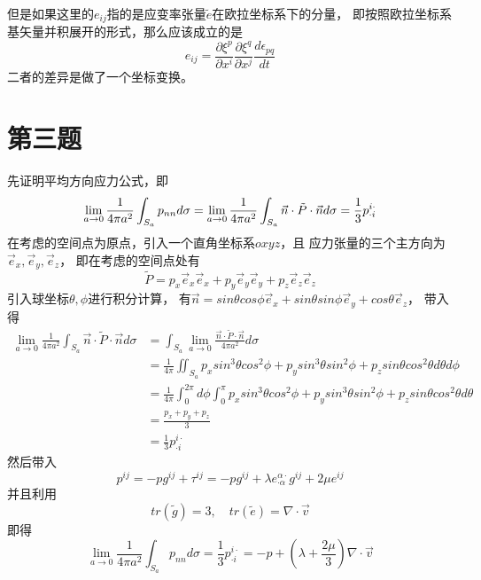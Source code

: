 \documentclass[UTF8]{ctexart}
\begin{document}
但是如果这里的$e_{ij}$指的是应变率张量$\tilde e$在欧拉坐标系下的分量，
即按照欧拉坐标系基矢量并积展开的形式，那么应该成立的是
\begin{equation*}
    e_{ij}=\frac{\partial \xi^p}{\partial x^i}\frac{\partial \xi^q}{\partial x^j}\frac{d\epsilon_{pq}}{dt}
\end{equation*}
二者的差异是做了一个坐标变换。

\section{第三题}

先证明平均方向应力公式，即
\begin{equation*}
    \lim_{a\to 0}\frac{1}{4\pi a^2}\int_{S_a} p_{nn} d\sigma
    =\lim_{a\to 0}\frac{1}{4\pi a^2}\int_{S_a} \vec n \cdot \tilde P \cdot \vec n d\sigma
    =\frac{1}{3}p^{i\cdot}_{\cdot i}
    \notag
\end{equation*}
在考虑的空间点为原点，引入一个直角坐标系$oxyz$，且
应力张量的三个主方向为$\vec e_x,\vec e_y,\vec e_z$，
即在考虑的空间点处有
\begin{equation*}
    \tilde P=p_x \vec e_x \vec e_x + p_y \vec e_y \vec e_y + p_z \vec e_z \vec e_z
\end{equation*}
引入球坐标$\theta,\phi$进行积分计算，
有$\vec n = sin\theta cos\phi \vec e_x+ sin\theta sin\phi \vec e_y +cos\theta \vec e_z$，
带入得
\begin{align*}
    \lim_{a\to 0}\frac{1}{4\pi a^2}\int_{S_a} \vec n \cdot \tilde P \cdot \vec n d\sigma
    &=\int_{S_a} \lim_{a\to 0}\frac{\vec n \cdot \tilde P \cdot \vec n}{4\pi a^2} d\sigma\\
    &=\frac{1}{4\pi } \iint_{S_a} p_x sin^3\theta cos^2\phi + p_y sin^3\theta sin^2\phi + p_z sin\theta cos^2\theta d\theta d\phi\\
    &=\frac{1}{4\pi } \int_{0}^{2\pi} d\phi \int_{0}^{\pi} p_x sin^3\theta cos^2\phi + p_y sin^3\theta sin^2\phi + p_z sin\theta cos^2\theta d\theta \\
    &=\frac{p_x+p_y+p_z}{3}\\
    &=\frac{1}{3}p^{i\cdot}_{\cdot i}
\end{align*}
然后带入
\begin{equation*}
    p^{ij}=-pg^{ij}+\tau ^{ij}
    =-pg^{ij}+\lambda e^{\alpha\cdot}_{\cdot \alpha} g^{ij} +2 \mu e^{ij}
\end{equation*}
并且利用
\begin{equation*}
    tr(\tilde g)=3,\quad tr(\tilde e)=\nabla \cdot \vec v
\end{equation*}
即得
\begin{equation*}
    \lim_{a\to 0}\frac{1}{4\pi a^2}\int_{S_a} p_{nn} d\sigma
    =\frac{1}{3}p^{i\cdot}_{\cdot i}=-p+(\lambda + \frac{2\mu}{3})\nabla \cdot \vec v
\end{equation*}
\end{document}
